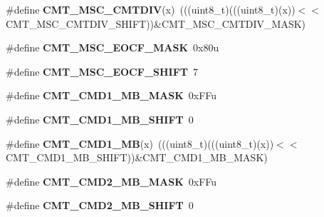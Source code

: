 \begin{DoxyCompactItemize}
\item 
\#define {\bfseries C\+M\+T\+\_\+\+M\+S\+C\+\_\+\+C\+M\+T\+D\+IV}(x)~(((uint8\+\_\+t)(((uint8\+\_\+t)(x))$<$$<$C\+M\+T\+\_\+\+M\+S\+C\+\_\+\+C\+M\+T\+D\+I\+V\+\_\+\+S\+H\+I\+FT))\&C\+M\+T\+\_\+\+M\+S\+C\+\_\+\+C\+M\+T\+D\+I\+V\+\_\+\+M\+A\+SK)\hypertarget{group__CMT__Register__Masks_ga4fb2c3b2ee10cfe9b48db2aa9e08551a}{}\label{group__CMT__Register__Masks_ga4fb2c3b2ee10cfe9b48db2aa9e08551a}

\item 
\#define {\bfseries C\+M\+T\+\_\+\+M\+S\+C\+\_\+\+E\+O\+C\+F\+\_\+\+M\+A\+SK}~0x80u\hypertarget{group__CMT__Register__Masks_ga1aec1fa9b79d496b3f5f32fab07495a3}{}\label{group__CMT__Register__Masks_ga1aec1fa9b79d496b3f5f32fab07495a3}

\item 
\#define {\bfseries C\+M\+T\+\_\+\+M\+S\+C\+\_\+\+E\+O\+C\+F\+\_\+\+S\+H\+I\+FT}~7\hypertarget{group__CMT__Register__Masks_gab505074d349c8d2c800e554a0893f312}{}\label{group__CMT__Register__Masks_gab505074d349c8d2c800e554a0893f312}

\item 
\#define {\bfseries C\+M\+T\+\_\+\+C\+M\+D1\+\_\+\+M\+B\+\_\+\+M\+A\+SK}~0x\+F\+Fu\hypertarget{group__CMT__Register__Masks_gae4b77d2880f04b69d33cacfe3978042a}{}\label{group__CMT__Register__Masks_gae4b77d2880f04b69d33cacfe3978042a}

\item 
\#define {\bfseries C\+M\+T\+\_\+\+C\+M\+D1\+\_\+\+M\+B\+\_\+\+S\+H\+I\+FT}~0\hypertarget{group__CMT__Register__Masks_ga8bbdd2644bc864f959170f9260981476}{}\label{group__CMT__Register__Masks_ga8bbdd2644bc864f959170f9260981476}

\item 
\#define {\bfseries C\+M\+T\+\_\+\+C\+M\+D1\+\_\+\+MB}(x)~(((uint8\+\_\+t)(((uint8\+\_\+t)(x))$<$$<$C\+M\+T\+\_\+\+C\+M\+D1\+\_\+\+M\+B\+\_\+\+S\+H\+I\+FT))\&C\+M\+T\+\_\+\+C\+M\+D1\+\_\+\+M\+B\+\_\+\+M\+A\+SK)\hypertarget{group__CMT__Register__Masks_gae3e2ac370668a3642cce5a73276c84c8}{}\label{group__CMT__Register__Masks_gae3e2ac370668a3642cce5a73276c84c8}

\item 
\#define {\bfseries C\+M\+T\+\_\+\+C\+M\+D2\+\_\+\+M\+B\+\_\+\+M\+A\+SK}~0x\+F\+Fu\hypertarget{group__CMT__Register__Masks_gac9616164033684cd0d73e63eb6381441}{}\label{group__CMT__Register__Masks_gac9616164033684cd0d73e63eb6381441}

\item 
\#define {\bfseries C\+M\+T\+\_\+\+C\+M\+D2\+\_\+\+M\+B\+\_\+\+S\+H\+I\+FT}~0\hypertarget{group__CMT__Register__Masks_gaeff28d00f2825fc455b2f37c218ce24f}{}\label{group__CMT__Register__Masks_gaeff28d00f2825fc455b2f37c218ce24f}


\end{DoxyCompactItemize}
